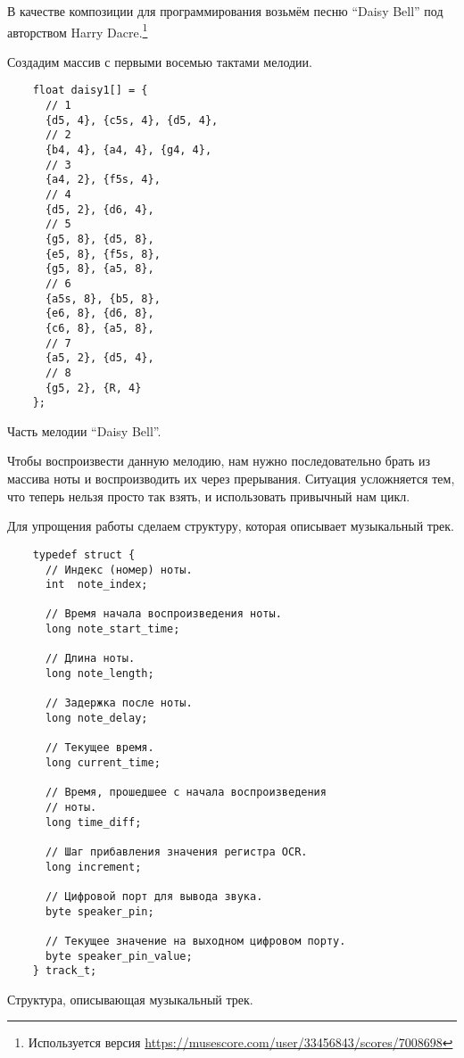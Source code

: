 \documentclass[../sparc.tex]{subfiles}
\begin{document}
В качестве композиции для программирования возьмём песню ``Daisy Bell'' под
авторством Harry Dacre.\footnote{Используется версия
\url{https://musescore.com/user/33456843/scores/7008698}}

Создадим массив с первыми восемью тактами мелодии.

\begin{listing}[H]
  \begin{verbatim}
    float daisy1[] = {
      // 1
      {d5, 4}, {c5s, 4}, {d5, 4},
      // 2
      {b4, 4}, {a4, 4}, {g4, 4},
      // 3
      {a4, 2}, {f5s, 4},
      // 4
      {d5, 2}, {d6, 4},
      // 5
      {g5, 8}, {d5, 8},
      {e5, 8}, {f5s, 8},
      {g5, 8}, {a5, 8},
      // 6
      {a5s, 8}, {b5, 8},
      {e6, 8}, {d6, 8},
      {c6, 8}, {a5, 8},
      // 7
      {a5, 2}, {d5, 4},
      // 8
      {g5, 2}, {R, 4}
    };
  \end{verbatim}
  \caption{Часть мелодии ``Daisy Bell''.}
  \label{listing:mcu-music-2}
\end{listing}

Чтобы воспроизвести данную мелодию, нам нужно последовательно брать из массива
ноты и воспроизводить их через прерывания.  Ситуация усложняется тем, что теперь
нельзя просто так взять, и использовать привычный нам цикл.

Для упрощения работы сделаем структуру, которая описывает музыкальный трек.

\begin{listing}[H]
  \begin{verbatim}
    typedef struct {
      // Индекс (номер) ноты.
      int  note_index;

      // Время начала воспроизведения ноты.
      long note_start_time;

      // Длина ноты.
      long note_length;

      // Задержка после ноты.
      long note_delay;

      // Текущее время.
      long current_time;

      // Время, прошедшее с начала воспроизведения
      // ноты.
      long time_diff;

      // Шаг прибавления значения регистра OCR.
      long increment;

      // Цифровой порт для вывода звука.
      byte speaker_pin;

      // Текущее значение на выходном цифровом порту.
      byte speaker_pin_value;
    } track_t;
  \end{verbatim}
  \caption{Структура, описывающая музыкальный трек.}
  \label{listing:mcu-music-3}
\end{listing}
\end{document}
